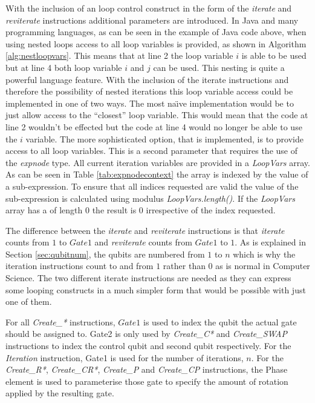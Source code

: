 With the inclusion of an loop control construct in the form of the \emph{iterate} and \emph{reviterate} instructions additional parameters are introduced.
In Java and many programming languages, as can be seen in the example of Java code above, when using nested loops access to all loop variables is provided, as shown in Algorithm \ref{alg:nestloopvars}.
This means that at line 2 the loop variable $i$ is able to be used but at line 4 both loop variable $i$ and $j$ can be used.
This nesting is quite a powerful language feature.
With the inclusion of the iterate instructions and therefore the possibility of nested iterations this loop variable access could be implemented in one of two ways.
The most na\"{\i}ve implementation would be to just allow access to the ``closest'' loop variable.
This would mean that the code at line 2 wouldn't be effected but the code at line 4 would no longer be able to use the $i$ variable.
The more sophisticated option, that is implemented, is to provide access to all loop variables.
This is a second parameter that requires the use of the \emph{expnode} type.
All current iteration variables are provided in a \emph{LoopVars} array.
As can be seen in Table \ref{tab:expnodecontext} the array is indexed by the value of a sub-expression.
To ensure that all indices requested are valid the value of the sub-expression is calculated using modulus \emph{LoopVars.length()}.
If the \emph{LoopVars} array has a of length $0$ the result is $0$ irrespective of the index requested.

The difference between the \emph{iterate} and \emph{reviterate} instructions is that \emph{iterate} counts from $1$ to $Gate1$ and \emph{reviterate} counts from $Gate1$ to $1$.
As is explained in Section \ref{sec:qubitnum}, the qubits are numbered from $1$ to $n$ which is why the iteration instructions count to and from $1$ rather than $0$ as is normal in Computer Science.
The two different iterate instructions are needed as they can express some looping constructs in a much simpler form that would be possible with just one of them.

For all \emph{Create\_*} instructions, $Gate1$ is used to index the qubit the actual gate should be assigned to.
Gate2 is only used by \emph{Create\_C*} and \emph{Create\_SWAP} instructions to index the control qubit and second qubit respectively.
For the \emph{Iteration} instruction, Gate1 is used for the number of iterations, $n$.
For the \emph{Create\_R*}, \emph{Create\_CR*}, \emph{Create\_P} and  \emph{Create\_CP} instructions, the Phase element is used to parameterise those gate to specify the amount of rotation applied by the resulting gate.

